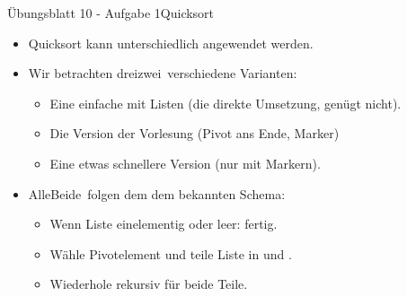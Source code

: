 \begin{frame}[c]{Übungsblatt 10 - Aufgabe 1\hfill Quicksort}
    \begin{itemize}[<+(1)->]
        \itemsep12.5pt
        \item Quicksort kann unterschiedlich angewendet werden.
        \item Wir betrachten \iffull drei\else zwei\fi\ verschiedene Varianten: \begin{itemize}
            \iffull \item Eine einfache mit Listen (die direkte Umsetzung, genügt nicht).\fi
            \item Die Version der Vorlesung (Pivot ans Ende, Marker)
            \item Eine etwas schnellere Version (nur mit Markern).
        \end{itemize}
        \item \iffull Alle\else Beide\fi\ folgen dem dem bekannten Schema: \begin{itemize}
            \item Wenn Liste einelementig oder leer: fertig.
            \item Wähle Pivotelement und teile Liste in  und .
            \item Wiederhole rekursiv für beide Teile.
        \end{itemize}
    \end{itemize}
\end{frame}


